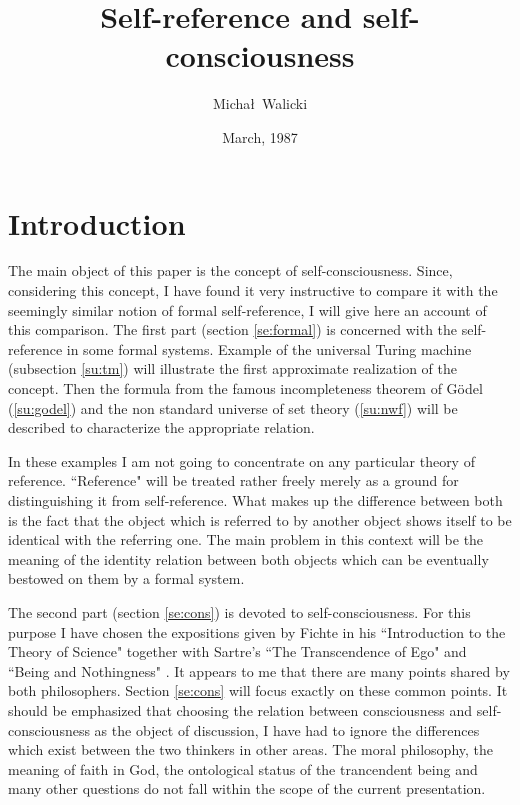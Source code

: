 


\title{Self-reference and self-consciousness}
\author{Micha{\l}\ Walicki}
\date{March, 1987}

\maketitle

\section{Introduction}
The main object of this paper is the concept of self-consciousness. 
Since, considering this concept, I have found 
it very instructive to compare it with the seemingly similar notion of formal 
self-reference, I will give here an 
account of this comparison. The first part (section \ref{se:formal}) is concerned with the self-reference in some formal 
systems. Example of the universal Turing machine (subsection \ref{su:tm}) will illustrate the first approximate realization of the concept. 
Then the formula from the famous incompleteness theorem of G\"{o}del (\ref{su:godel}) and 
the non standard 
universe of set theory (\ref{su:nwf}) will 
be described to characterize the appropriate relation.

In these examples I am not going to concentrate on any particular theory of reference. ``Reference" will be treated 
rather freely merely as a ground for distinguishing it from self-reference. What makes up the difference between both 
is the fact that the object which is referred to by another object shows itself to be identical with the referring one. 
The main problem in this context will be the meaning of the identity relation between both objects which can be 
eventually bestowed on them by a formal system.

The second part (section \ref{se:cons}) is devoted to self-consciousness. 
For this purpose I have chosen the expositions given by Fichte 
in his ``Introduction to the Theory of Science" \cite{ITS} together with 
Sartre's ``The Transcendence of Ego" \cite{ToE} and ``Being and 
Nothingness" \cite{BN}. It appears to me that there are many points shared by both philosophers. Section \ref{se:cons} will focus exactly 
on these common points. It should be emphasized that choosing the relation between consciousness and self-consciousness as the object of discussion, 
I have had to ignore the differences which exist between the two thinkers 
in other areas. The moral philosophy, the meaning of faith in God, the ontological status of the trancendent being 
and many other questions do not fall within the scope of the current presentation.

